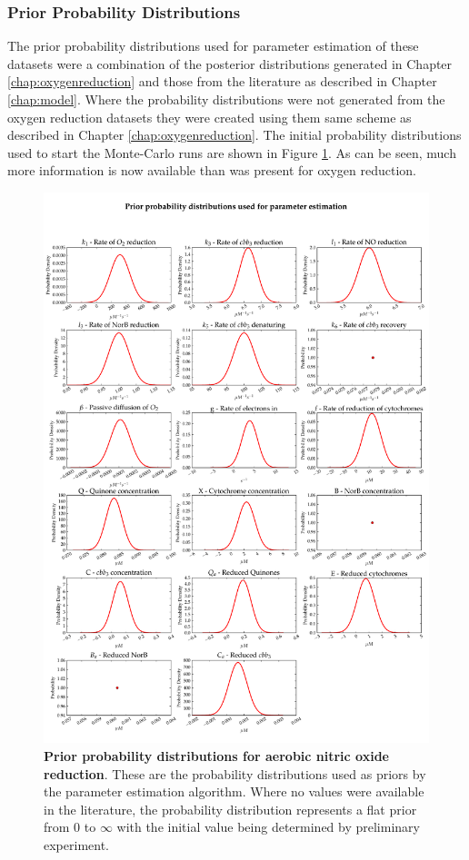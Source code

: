 \subsubsection{Prior Probability Distributions}
The prior probability distributions used for parameter estimation of these datasets were a combination of the posterior distributions generated in Chapter \ref{chap:oxygenreduction} and those from the literature as described in Chapter \ref{chap:model}. Where the probability distributions were not generated from the oxygen reduction datasets they were created using them same scheme as described in Chapter \ref{chap:oxygenreduction}. The initial probability distributions used to start the Monte-Carlo runs are shown in Figure \ref{fig:aer_no_priors}. As can be seen, much more information is now available than was present for oxygen reduction.
\begin{figure}[tbp]
 \centering
 \includegraphics[width=15cm, trim=0cm 0cm 0cm 0cm]{./06-noreduction/data/aer-no-priors.pdf}
 \caption[Prior probability distributions for aerobic nitric oxide reduction]{{\bf Prior probability distributions for aerobic nitric oxide reduction}. These are the probability distributions used as priors by the parameter estimation algorithm. Where no values were available in the literature, the probability distribution represents a flat prior from 0 to $\infty$ with the initial value being determined by preliminary experiment.
 \label{fig:aer_no_priors}}
\end{figure}

